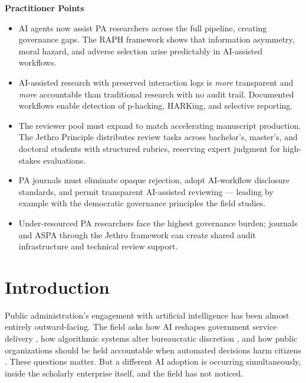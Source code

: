\documentclass[12pt]{article}
\begin{document}
\bigskip
\noindent\textbf{Practitioner Points}
\begin{itemize}\setlength{\itemsep}{2pt}
  \item AI agents now assist PA researchers across the full pipeline, creating governance
    gaps. The RAPH framework shows that information asymmetry, moral hazard, and adverse
    selection arise predictably in AI-assisted workflows.
  \item AI-assisted research with preserved interaction logs is \emph{more} transparent and
    \emph{more} accountable than traditional research with no audit trail. Documented
    workflows enable detection of p-hacking, HARKing, and selective reporting.
  \item The reviewer pool must expand to match accelerating manuscript production. The
    Jethro Principle distributes review tasks across bachelor's, master's, and doctoral
    students with structured rubrics, reserving expert judgment for high-stakes evaluations.
  \item PA journals must eliminate opaque rejection, adopt AI-workflow disclosure standards,
    and permit transparent AI-assisted reviewing --- leading by example with the democratic
    governance principles the field studies.
  \item Under-resourced PA researchers face the highest governance burden; journals
    and ASPA through the Jethro framework can create shared audit infrastructure and technical review support.
\end{itemize}

\newpage


\section{Introduction}

Public administration's engagement with artificial intelligence has been almost entirely
outward-facing. The field asks how AI reshapes government service delivery
\citep{zhu2025public, oecd2025governing}, how algorithmic systems alter bureaucratic
discretion \citep{bullock2019artificial, buffat2015street}, and how public organizations
should be held accountable when automated decisions harm citizens
\citep{diakopoulos2016accountability, meijer2021algorithmicbureaucracy}. These questions
matter. But a different AI adoption is occurring simultaneously, inside the scholarly
enterprise itself, and the field has not noticed.
\end{document}
